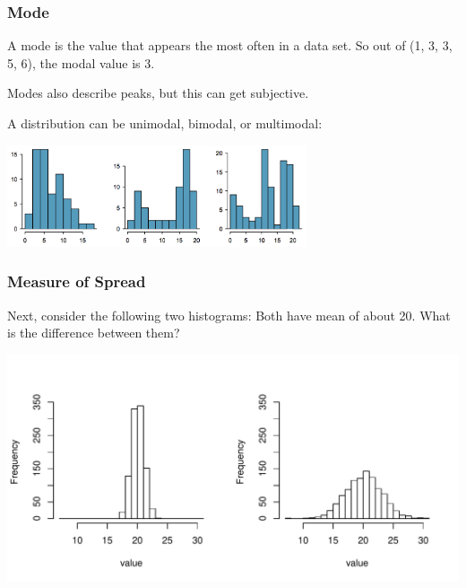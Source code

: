 \documentclass[handout]{beamer}
\newcommand{\blue}[1]{\textcolor{blue2}{#1}}
\begin{document}
\begin{frame}[fragile]
\frametitle{Mode}
A \blue{mode} is the value that appears the most often in a data set.  So out of (1, 3, 3, 5, 6), the modal value is 3.  

\vspace{0.25cm}

\pause Modes also describe \blue{peaks}, but this can get subjective. 

\vspace{0.25cm}

\pause A distribution can be \blue{unimodal}, \blue{bimodal}, or \blue{multimodal}:

\begin{center}
\includegraphics[height=3cm]{figure/modes.png}
\end{center}

\end{frame}



\begin{frame}[fragile]
\frametitle{Measure of Spread}

Next, consider the following two histograms:  Both have mean of about 20.  What is the difference between them?

\begin{center}
\pause \includegraphics[width=\textwidth]{figure/spread.pdf}
\end{center}

\end{frame}
\end{document}
